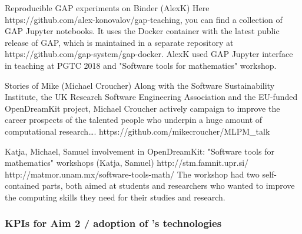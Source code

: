 \begin{Aim 1}
               Reproducible GAP experiments on Binder (AlexK)
Here https://github.com/alex-konovalov/gap-teaching, you can find a collection of GAP Jupyter notebooks. It uses the Docker container with the latest public release of GAP, which is maintained in a separate repository at https://github.com/gap-system/gap-docker.
AlexK used GAP Jupyter interface in teaching at PGTC 2018 and "Software tools for mathematics" workshop.

             Stories of Mike (Michael Croucher)
Along with the Software Sustainability Institute, the UK Research Software Engineering Association and the EU-funded OpenDreamKit project, Michael Croucher actively campaign to improve the career prospects of the talented people who underpin a huge amount of computational research…. https://github.com/mikecroucher/MLPM_talk

             Katja, Michael, Samuel involvement in OpenDreamKit: "Software tools for mathematics" workshops (Katja, Samuel)
http://stm.famnit.upr.si/
http://matmor.unam.mx/software-tools-math/
The workshop had two self-contained parts, both aimed at students and researchers who wanted to improve the computing skills they need for their studies and research.

                        
                       
                        

\subsubsection{KPIs for Aim 2 / adoption of \ODK's technologies}

\end{Aim 1}
